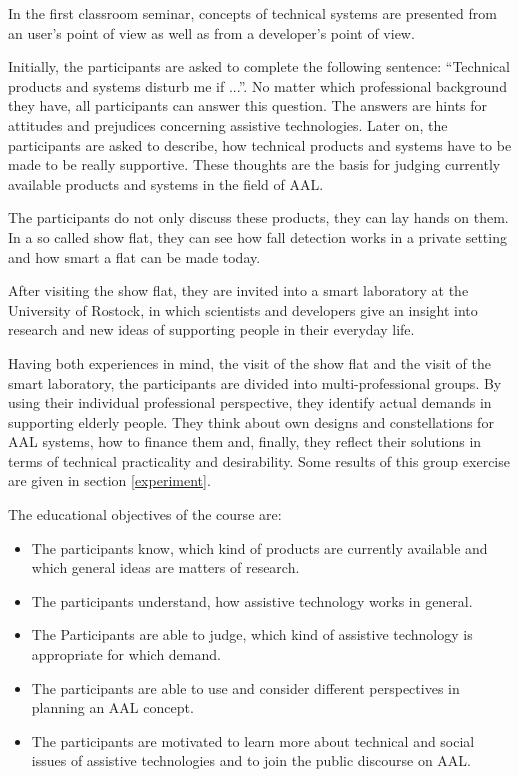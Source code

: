 \documentclass[runningheads,a4paper]{llncs}
\begin{document}
In the first classroom seminar, concepts of technical systems are presented from an user's point of view as well as from a developer's point of view.

Initially, the participants are asked to complete the following sentence: ``Technical products and systems disturb me if ...''. No matter which professional background they have, all participants can answer this question. The answers are hints for attitudes and prejudices concerning assistive technologies. Later on, the participants are asked to describe, how technical products and systems have to be made to be really supportive. These thoughts are the basis for judging currently available products and systems in the field of AAL.

The participants do not only discuss these products, they can lay hands on them. In a so called show flat, they can see how fall detection works in a private setting and how smart a flat can be made today.

After visiting the show flat, they are invited into a smart laboratory at the University of Rostock, in which scientists and developers give an insight into research and new ideas of supporting people in their everyday life.

Having both experiences in mind, the visit of the show flat and the visit of the smart laboratory, the participants are divided into multi-professional groups. By using their individual professional perspective, they identify actual demands in supporting elderly people. They think about own designs and constellations for AAL systems, how to finance them and, finally, they reflect their solutions in terms of technical practicality and desirability. Some results of this group exercise are given in section \ref{experiment}.

The educational objectives of the course are:

\begin{itemize}
\item The participants know, which kind of products are currently available and which general ideas are matters of research. 
\item The participants understand, how assistive technology works in general. 
\item The Participants are able to judge, which kind of assistive technology is appropriate for which demand.
\item The participants are able to use and consider different perspectives in planning an AAL concept.
\item The participants are motivated to learn more about technical and social issues of assistive technologies and to join the public discourse on AAL.
\end {itemize}
\end{document}
